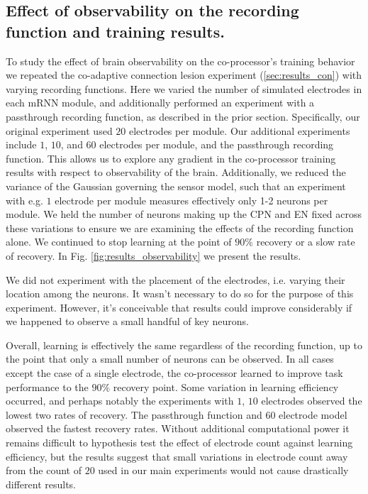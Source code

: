 \documentclass[12pt]{iopart}
\begin{document}
\subsection{Effect of observability on the recording function and training results.}
\label{sup:observability}

To study the effect of brain observability on the co-processor's training behavior
we repeated the co-adaptive connection lesion experiment (\ref{sec:results_con})
with varying recording functions. Here we varied the number of simulated electrodes
in each mRNN module, and additionally performed an experiment with a passthrough recording
function, as described in the prior section. Specifically, our original experiment used
$20$ electrodes per module. Our additional experiments include $1$, $10$, and $60$ electrodes
per module, and the passthrough recording function. This allows us to explore any
gradient in the co-processor training results with respect to observability of the 
brain. Additionally, we reduced the variance of the Gaussian governing
the sensor model, such that an experiment with e.g. $1$ electrode per
module measures effectively only 1-2 neurons per module. We held the number of
neurons making up the CPN and EN fixed across these variations to ensure we
are examining the effects of the recording function alone. We continued to stop
learning at the point of $90\%$ recovery or a slow rate of recovery. In Fig.
\ref{fig:results_observability} we present the results.

We did not experiment with the placement of the electrodes, i.e. varying their
location among the neurons. It wasn't necessary to do so for the purpose of this
experiment. However, it's conceivable that results could improve considerably if we
happened to observe a small handful of key neurons.

Overall, learning is effectively the same regardless of the recording 
function, up to the point that only a small number of neurons can be 
observed. In all cases except the 
case of a single electrode, the co-processor learned to improve task
performance to the $90\%$ recovery point. Some variation in learning
efficiency occurred, and perhaps notably the experiments with $1$, $10$
electrodes observed the lowest two rates of recovery. The passthrough 
function and $60$ electrode model observed the fastest recovery rates.
Without additional computational power it remains difficult to hypothesis
test the effect of electrode count against learning efficiency, but the
results suggest that small variations in electrode count away from the
count of $20$ used in our main experiments would not cause drastically
different results.
\end{document}
